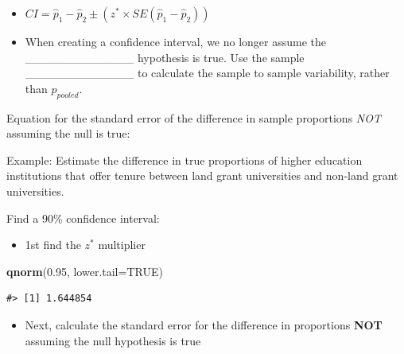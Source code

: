 \documentclass[
]{report}
\newenvironment{Shaded}{\begin{snugshade}}{\end{snugshade}}
\newcommand{\AttributeTok}[1]{\textcolor[rgb]{0.13,0.29,0.53}{#1}}
\newcommand{\ConstantTok}[1]{\textcolor[rgb]{0.56,0.35,0.01}{#1}}
\newcommand{\FloatTok}[1]{\textcolor[rgb]{0.00,0.00,0.81}{#1}}
\newcommand{\FunctionTok}[1]{\textcolor[rgb]{0.13,0.29,0.53}{\textbf{#1}}}
\newcommand{\NormalTok}[1]{#1}
\providecommand{\tightlist}{%
  \setlength{\itemsep}{0pt}\setlength{\parskip}{0pt}}
\begin{document}
\begin{itemize}
\tightlist
\item
  \(CI = \hat{p}_1-\hat{p}_2 \pm (z^* \times SE(\hat{p}_1-\hat{p}_2))\)
\end{itemize}


\begin{itemize}
\tightlist
\item
  When creating a confidence interval, we no longer assume the \_\_\_\_\_\_\_\_\_\_\_\_\_ hypothesis is true. Use the sample \_\_\_\_\_\_\_\_\_\_\_\_\_ to calculate the sample to sample variability, rather than \(\hat{p}_{pooled}\).
\end{itemize}


Equation for the standard error of the difference in sample proportions \emph{NOT} assuming the null is true:

\vspace{0.6in}

\newpage

Example: Estimate the difference in true proportions of higher education institutions that offer tenure between land grant universities and non-land grant universities.

Find a 90\% confidence interval:

\begin{itemize}
\tightlist
\item
  1st find the \(z^*\) multiplier
\end{itemize}

\begin{Shaded}
\begin{Highlighting}[]
\FunctionTok{qnorm}\NormalTok{(}\FloatTok{0.95}\NormalTok{, }\AttributeTok{lower.tail=}\ConstantTok{TRUE}\NormalTok{)}
\end{Highlighting}
\end{Shaded}

\begin{verbatim}
#> [1] 1.644854
\end{verbatim}

\begin{itemize}
\tightlist
\item
  Next, calculate the standard error for the difference in proportions \textbf{NOT} assuming the null hypothesis is true
\end{itemize}

\vspace{0.8in}
\end{document}
